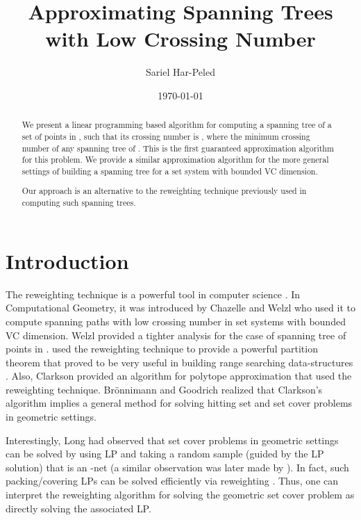 \documentclass[12pt]{article}
\newcommand{\Term}[1]{\textsf{#1}}
\newcommand{\LP}{\Term{L{}P}\xspace}
\newcommand{\VC}{\Term{V{C}}\xspace}
\providecommand{\Bronnimann}{Br{\"o}nnimann\xspace}
\begin{document}
\title{Approximating Spanning Trees with Low Crossing Number}

\author{Sariel Har-Peled\SarielThanks{}}

\date{\today}

\maketitle

\begin{abstract}
    We present a linear programming based algorithm for computing a
    spanning tree  of a set  of  points in ,
    such that its crossing number is ,
    where  the minimum crossing number of any spanning tree of
    . This is the first guaranteed approximation algorithm
    for this problem.  We provide a similar approximation algorithm
    for the more general settings of building a spanning tree for a
    set system with bounded \VC dimension.

    Our approach is an alternative to the reweighting technique
    previously used in computing such spanning trees.
\end{abstract}




\section{Introduction}

The reweighting technique is a powerful tool in computer science
\cite{ahk-mwmma-06}. In Computational Geometry, it was introduced by
Chazelle and Welzl \cite{cw-qorss-89} who used it to compute spanning
paths with low crossing number in set systems with bounded \VC
dimension. Welzl \cite{w-stlcn-92} provided a tighter analysis for the
case of spanning tree of points in .  \Matousek \cite{m-ept-92}
used the reweighting technique to provide a powerful partition theorem
that proved to be very useful in building range searching
data-structures \cite{ae-rsir-98}.  Also, Clarkson \cite{c-apca-93}
provided an algorithm for polytope approximation that used the
reweighting technique.  \Bronnimann and Goodrich \cite{bg-aoscf-95}
realized that Clarkson's algorithm implies a general method for
solving hitting set and set cover problems in geometric settings.


Interestingly, Long \cite{l-upsda-01} had observed that set cover
problems in geometric settings can be solved by using \LP and taking a
random sample (guided by the \LP solution) that is an -net (a
similar observation was later made by \cite{ers-hsvcs-05}). In fact,
such packing/covering \LP{}s can be solved efficiently via reweighting
\cite{pst-faafp-91}. Thus, one can interpret the reweighting algorithm
for solving the geometric set cover problem as directly solving the
associated \LP.
\end{document}
